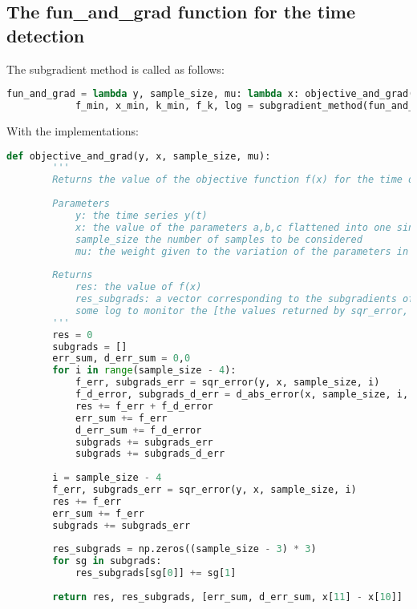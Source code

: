 \documentclass[11pt]{article}
\begin{document}
    
    \subsection{The fun\_and\_grad function for the time detection}
    The subgradient method is called as follows:
        \begin{lstlisting}[language=Python]
            fun_and_grad = lambda y, sample_size, mu: lambda x: objective_and_grad(y, x, sample_size, mu)
            f_min, x_min, k_min, f_k, log = subgradient_method(fun_and_grad(cd_y, sample_size, mu), x0, alpha, min_k, max_k)
        \end{lstlisting}
    
    With the implementations:

    \begin{lstlisting}[language=Python]
        def objective_and_grad(y, x, sample_size, mu):
        '''
        Returns the value of the objective function f(x) for the time detction and a vector corresponding to a subgradient df(x).
        
        Parameters
            y: the time series y(t)
            x: the value of the parameters a,b,c flattened into one single vector
            sample_size the number of samples to be considered
            mu: the weight given to the variation of the parameters in the objective function
        
        Returns
            res: the value of f(x)
            res_subgrads: a vector corresponding to the subgradients of f(x)
            some log to monitor the [the values returned by sqr_error, and d_abs_error,  the value of x[11]-x[10]]
        '''
        res = 0
        subgrads = []
        err_sum, d_err_sum = 0,0
        for i in range(sample_size - 4):
            f_err, subgrads_err = sqr_error(y, x, sample_size, i)
            f_d_error, subgrads_d_err = d_abs_error(x, sample_size, i, mu)
            res += f_err + f_d_error
            err_sum += f_err
            d_err_sum += f_d_error
            subgrads += subgrads_err
            subgrads += subgrads_d_err
        
        i = sample_size - 4
        f_err, subgrads_err = sqr_error(y, x, sample_size, i)
        res += f_err
        err_sum += f_err
        subgrads += subgrads_err
    
        res_subgrads = np.zeros((sample_size - 3) * 3)
        for sg in subgrads:
            res_subgrads[sg[0]] += sg[1]
        
        return res, res_subgrads, [err_sum, d_err_sum, x[11] - x[10]]
        

\end{lstlisting}
\end{document}
